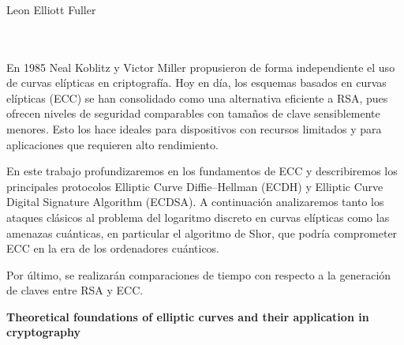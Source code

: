 \chapter*{}






\cleardoublepage
\thispagestyle{empty}

\begin{center}
{\large\bfseries \myTitle}\\
\end{center}
\begin{center}
Leon Elliott Fuller\\
\end{center}

\\

\vspace{0.7cm}
\\
En 1985 Neal Koblitz y Victor Miller propusieron de forma independiente el uso de curvas elípticas en criptografía. Hoy en día, los esquemas basados en curvas elípticas (ECC) se han consolidado como una alternativa eficiente a RSA, pues ofrecen niveles de seguridad comparables con tamaños de clave sensiblemente menores. Esto los hace ideales para dispositivos con recursos limitados y para aplicaciones que requieren alto rendimiento.

En este trabajo profundizaremos en los fundamentos de ECC y describiremos los principales protocolos Elliptic Curve Diffie–Hellman (ECDH) y Elliptic Curve Digital Signature Algorithm (ECDSA). A continuación analizaremos tanto los ataques clásicos al problema del logaritmo discreto en curvas elípticas como las amenazas cuánticas, en particular el algoritmo de Shor, que podría comprometer ECC en la era de los ordenadores cuánticos.

Por último, se realizarán comparaciones de tiempo con respecto a la generación de claves entre RSA y ECC.

\cleardoublepage


\thispagestyle{empty}


\begin{center}
{\large\bfseries Theoretical foundations of elliptic curves and their application in cryptography}\\
\end{center}
\begin{center}
\myName\\
\end{center}

